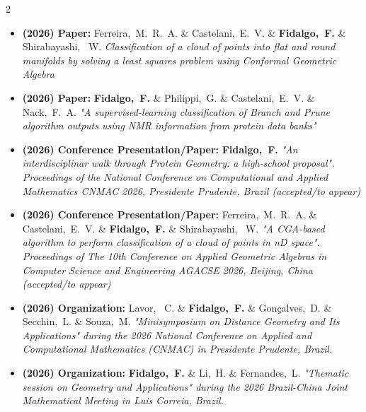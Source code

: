 \documentclass[10pt,A4,english]{article}
\begin{document}
\begin{paracol}{2}
\begin{rightcolumn}
\begin{itemize}[leftmargin=*]
\medskip

\item \textbf{\color{blue}(2026) Paper:} Ferreira,~M.~R.~A. \& Castelani,~E.~V. \& \textbf{Fidalgo,~F.} 
\& Shirabayashi, ~W.
{\it Classification of a cloud of points into flat and round manifolds by solving a least squares problem using Conformal Geometric Algebra}

\medskip

\item \textbf{\color{blue}(2026) Paper:} \textbf{Fidalgo,~F.} \& Philippi,~G. \& Castelani,~E.~V. 
\& Nack,~F.~A. 
{\it "A supervised-learning classification of Branch and Prune algorithm outputs using NMR information from protein data banks"} 

\medskip

\item \textbf{\color{blue}(2026) Conference Presentation/Paper:} \textbf{Fidalgo,~F.}
{\it "An interdisciplinar walk through Protein Geometry: a high-school proposal". 
Proceedings of the National Conference on Computational and Applied Mathematics CNMAC 2026,
Presidente Prudente, Brazil (accepted/to appear) }

\medskip

\item \textbf{\color{blue}(2026) Conference Presentation/Paper:} Ferreira,~M.~R.~A. \& Castelani,~E.~V. \& 
\textbf{Fidalgo,~F.} \& Shirabayashi, ~W.
{\it "A CGA-based algorithm to perform classification of a cloud of points in nD space". 
Proceedings of The 10th Conference on Applied Geometric Algebras
in Computer Science and Engineering AGACSE 2026, Beijing, China (accepted/to appear) } 

\medskip

\item \textbf{\color{blue}(2026) Organization:} Lavor, ~C. \& \textbf{Fidalgo,~F.} \& Gonçalves,~D. 
\& Secchin,~L. \& Souza,~M.
{\it "Minisymposium on Distance Geometry and Its Applications" during the 2026 National Conference
on Applied and Computational Mathematics (CNMAC) in Presidente Prudente, Brazil.}

\medskip

\item \textbf{\color{blue}(2026) Organization:} \textbf{Fidalgo,~F.} \& Li,~H. 
\& Fernandes,~L.
{\it "Thematic session on Geometry and Applications" during the 2026 Brazil-China Joint
Mathematical Meeting in Luis Correia, Brazil.}

\end{itemize}


\end{rightcolumn}
\end{paracol}
\end{document}
